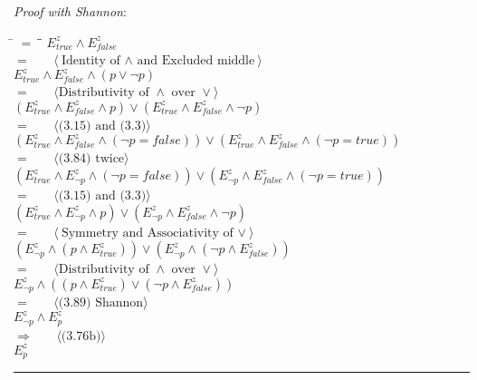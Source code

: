 \documentclass[12pt, fleqn, leqno]{article}
\newcommand{\lgap}{2pt}                             %
\newcommand{\mymathindent}{24pt}                    %
\newcommand{\impl}{\ensuremath{\Rightarrow}}        %
\newcommand{\myqed}{\rule[-.23ex]{1.2ex}{2.0ex}}
\newcommand{\myqedtab}{\hspace{384pt}}              %
\newcommand{\Gll} {\langle}                         %
\newcommand{\Ggg} {\rangle}                         %
\newcommand{\Hint}[1]     {\ \ \ $\Gll              \mbox{#1} \Ggg$ }   %
\begin{document}
\emph{Proof with Shannon}:
\begin{tabbing}
\hspace{\mymathindent} \= $= \;$ \= \myqedtab \= \kill
	\> \>  $E^{z}_{true}\land E^{z}_{false}$\\
	\> $=$  \>  \Hint{Identity of $\land$ and Excluded middle}\\[\lgap]
	\> \>   $E^{z}_{true}\land E^{z}_{false}\land(p\lor\lnot p)$\\
	\> $=$  \>  \Hint{Distributivity of $\land$ over $\lor$}\\[\lgap]
	\> \>   $(E^{z}_{true}\land E^{z}_{false}\land p)\lor(E^{z}_{true}\land E^{z}_{false}\land\lnot p)$\\
	\> $=$  \>  \Hint{(3.15) and (3.3)}\\[\lgap]
	\> \>   $(E^{z}_{true}\land E^{z}_{false}\land (\lnot p=false))\lor(E^{z}_{true}\land E^{z}_{false}\land (\lnot p=true))$\\
	\> $=$  \>  \Hint{(3.84) twice}\\[\lgap]
	\> \>   $(E^{z}_{true}\land E^{z}_{\lnot p}\land (\lnot p=false))\lor(E^{z}_{\lnot p}\land E^{z}_{false}\land (\lnot p=true))$\\
	\> $=$  \>  \Hint{(3.15) and (3.3)}\\[\lgap]
	\> \>   $(E^{z}_{true}\land E^{z}_{\lnot p}\land p)\lor(E^{z}_{\lnot p}\land E^{z}_{false}\land \lnot p)$\\
	\> $=$  \>  \Hint{Symmetry and Associativity of $\lor$}\\[\lgap]
	\> \>  $(E^{z}_{\lnot p}\land (p\land E^{z}_{true}))\lor(E^{z}_{\lnot p}\land (\lnot p\land E^{z}_{false}))$\\
	\> $=$  \>  \Hint{Distributivity of $\land$ over $\lor$}\\[\lgap]
	\> \>   $E^{z}_{\lnot p}\land ((p\land E^{z}_{true})\lor (\lnot p\land E^{z}_{false}))$\\
	\> $=$  \>  \Hint{(3.89) Shannon}\\[\lgap]
	\> \>   $E^{z}_{\lnot p}\land E^{z}_{p}$\\
	\> $\impl$  \>  \Hint{(3.76b)}\\[\lgap]
	\> \>   $E^{z}_{p}$ \quad \myqed\\
\end{tabbing}
\end{document}
